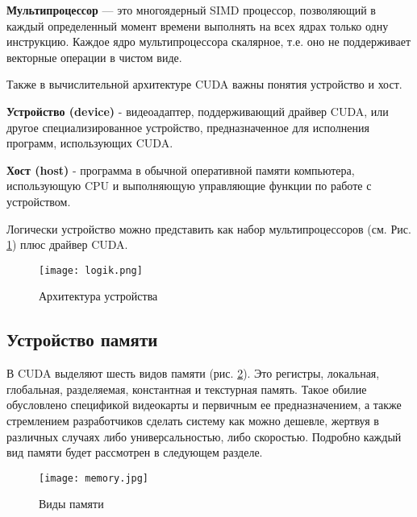 \documentclass[a4paper, 12pt]{article}
\begin{document}
    \textbf{Мультипроцессор} — это многоядерный SIMD процессор, позволяющий в каждый определенный момент времени выполнять на всех ядрах только одну инструкцию. Каждое ядро мультипроцессора скалярное, т.е. оно не поддерживает векторные операции в чистом виде.
    
    Также в вычислительной архитектуре CUDA важны понятия устройство и хост.
    
    \textbf{Устройство (device)} - видеоадаптер, поддерживающий драйвер CUDA, или другое специализированное устройство, предназначенное для исполнения программ, использующих CUDA.
    
    
    \textbf{Хост (host)} - программа в обычной оперативной памяти компьютера, использующую CPU и выполняющую управляющие функции по работе с устройством.
    
    Логически устройство можно представить как набор мультипроцессоров (см. Рис. \ref{device}) плюс драйвер CUDA.
    
    \begin{figure}[h!]
    	\centering\texttt{[image: logik.png]}
         \caption{Архитектура устройства}	
     \label{device}
    \end{figure}

    \clearpage
    \subsection{Устройство памяти}
    В CUDA выделяют шесть видов памяти (рис. \ref{memory}). Это регистры, локальная, глобальная, разделяемая, константная и текстурная память.
    Такое обилие обусловлено спецификой видеокарты и первичным ее предназначением, а также стремлением разработчиков сделать систему как можно дешевле, жертвуя в различных случаях либо универсальностью, либо скоростью. Подробно каждый вид памяти будет рассмотрен в следующем разделе.
    \begin{figure}[h!]
    	\centering\texttt{[image: memory.jpg]}
         \caption{Виды памяти}	
     \label{memory}
    \end{figure}
\end{document}
